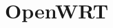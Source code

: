 \documentclass[../xdudla00-porting-Tang-to-Open-WRT.tex]{subfiles}
\begin{document}
\chapter{OpenWRT}\label{owrt}
\end{document}
